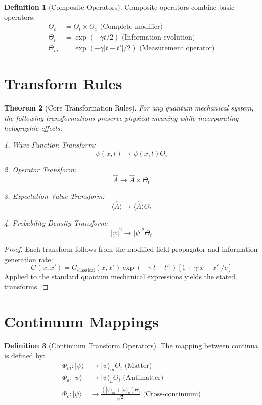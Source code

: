 \documentclass{article}
\theoremstyle{plain}
\newtheorem{theorem}{Theorem}[section]
\theoremstyle{definition}
\newtheorem{definition}[theorem]{Definition}
\theoremstyle{remark}
\begin{document}
\begin{definition}[Composite Operators]
Composite operators combine basic operators:
\begin{align*}
\Theta_c &= \Theta_t \times \Theta_x \text{ (Complete modifier)} \\
\Theta_i &= \exp(-\gamma t/2) \text{ (Information evolution)} \\
\Theta_m &= \exp(-\gamma|t-t'|/2) \text{ (Measurement operator)}
\end{align*}
\end{definition}

\section{Transform Rules}

\begin{theorem}[Core Transformation Rules]
For any quantum mechanical system, the following transformations preserve physical meaning while incorporating holographic effects:

1. Wave Function Transform:
\[\psi(x,t) \rightarrow \psi(x,t)\Theta_i\]

2. Operator Transform:
\[\hat{A} \rightarrow \hat{A} \times \Theta_t\]

3. Expectation Value Transform:
\[\langle\hat{A}\rangle \rightarrow \langle\hat{A}\rangle\Theta_t\]

4. Probability Density Transform:
\[|\psi|^2 \rightarrow |\psi|^2\Theta_t\]
\end{theorem}

\begin{proof}
Each transform follows from the modified field propagator and information generation rate:
\[G(x,x') = G_{\text{classical}}(x,x')\exp(-\gamma|t-t'|)[1 + \gamma|x-x'|/c]\]
Applied to the standard quantum mechanical expressions yields the stated transforms.
\end{proof}

\section{Continuum Mappings}

\begin{definition}[Continuum Transform Operators]
The mapping between continua is defined by:
\begin{align*}
\Phi_m: |\psi\rangle &\rightarrow |\psi\rangle_m\Theta_i \text{ (Matter)} \\
\Phi_a: |\psi\rangle &\rightarrow |\psi\rangle_a\Theta_i \text{ (Antimatter)} \\
\Phi_c: |\psi\rangle &\rightarrow \frac{(|\psi\rangle_m + |\psi\rangle_a)\Theta_i}{\sqrt{2}} \text{ (Cross-continuum)}
\end{align*}
\end{definition}
\end{document}
